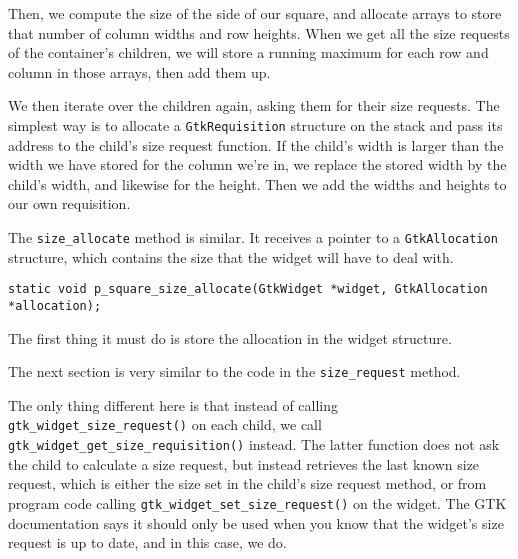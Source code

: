 \documentclass[%
			   halfparskip,smallheadings,pointlessnumbers]%
			   {scrartcl} %
\begin{document}


Then, we compute the size of the side of our square, and allocate arrays to store that number of column widths and row heights. When we get all the size requests of the container's children, we will store a running maximum for each row and column in those arrays, then add them up.



We then iterate over the children again, asking them for their size requests. The simplest way is to allocate a \lstinline$GtkRequisition$ structure on the stack and pass its address to the child's size request function. If the child's width is larger than the width we have stored for the column we're in, we replace the stored width by the child's width, and likewise for the height. Then we add the widths and heights to our own requisition.



The \lstinline$size_allocate$ method is similar. It receives a pointer to a \lstinline$GtkAllocation$ structure, which contains the size that the widget will have to deal with.

\begin{lstlisting}
static void p_square_size_allocate(GtkWidget *widget, GtkAllocation *allocation);
\end{lstlisting}

The first thing it must do is store the allocation in the widget structure.



The next section is very similar to the code in the \lstinline$size_request$ method.



The only thing different here is that instead of calling \lstinline$gtk_widget_size_request()$ on each child, we call \lstinline$gtk_widget_get_size_requisition()$ instead. The latter function does not ask the child to calculate a size request, but instead retrieves the last known size request, which is either the size set in the child's size request method, or from program code calling \lstinline$gtk_widget_set_size_request()$ on the widget. The GTK documentation says it should only be used when you know that the widget's size request is up to date, and in this case, we do.
\end{document}
